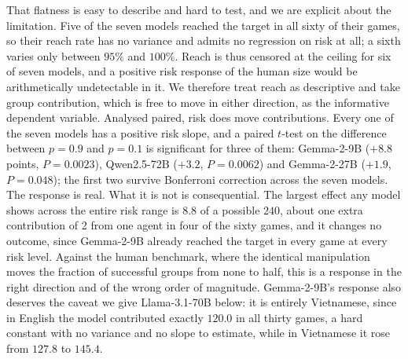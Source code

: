\documentclass[openacc]{rsproca_new}
\begin{document}
That flatness is easy to describe and hard to test, and we are explicit about the limitation. Five of the seven models reached the target in all sixty of their games, so their reach rate has no variance and admits no regression on risk at all; a sixth varies only between $95\%$ and $100\%$. Reach is thus censored at the ceiling for six of seven models, and a positive risk response of the human size would be arithmetically undetectable in it. We therefore treat reach as descriptive and take group contribution, which is free to move in either direction, as the informative dependent variable. Analysed paired, risk does move contributions. Every one of the seven models has a positive risk slope, and a paired $t$-test on the difference between $p=0.9$ and $p=0.1$ is significant for three of them: Gemma-2-9B ($+8.8$ points, $P=0.0023$), Qwen2.5-72B ($+3.2$, $P=0.0062$) and Gemma-2-27B ($+1.9$, $P=0.048$); the first two survive Bonferroni correction across the seven models. The response is real. What it is not is consequential. The largest effect any model shows across the entire risk range is $8.8$ of a possible $240$, about one extra contribution of 2 from one agent in four of the sixty games, and it changes no outcome, since Gemma-2-9B already reached the target in every game at every risk level. Against the human benchmark, where the identical manipulation moves the fraction of successful groups from none to half, this is a response in the right direction and of the wrong order of magnitude. Gemma-2-9B's response also deserves the caveat we give Llama-3.1-70B below: it is entirely Vietnamese, since in English the model contributed exactly $120.0$ in all thirty games, a hard constant with no variance and no slope to estimate, while in Vietnamese it rose from $127.8$ to $145.4$.
\end{document}
